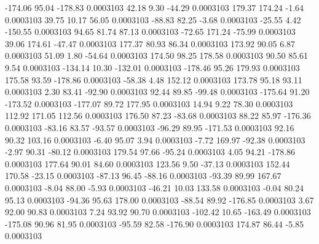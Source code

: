      -174.06       95.04     -178.83     0.0003103
       42.18        9.30      -44.29     0.0003103
      179.37      174.24       -1.64     0.0003103
       39.75       10.17       56.05     0.0003103
      -88.83       82.25       -3.68     0.0003103
      -25.55        4.42     -150.55     0.0003103
       94.65       81.74       87.13     0.0003103
      -72.65      171.24      -75.99     0.0003103
       39.06      174.61      -47.47     0.0003103
      177.37       80.93       86.34     0.0003103
      173.92       90.05        6.87     0.0003103
       51.09        1.80      -54.64     0.0003103
      174.50       98.25      178.58     0.0003103
       90.50       85.61        9.54     0.0003103
     -134.14       10.30     -132.01     0.0003103
     -178.46       95.26      179.93     0.0003103
      175.58       93.59     -178.86     0.0003103
      -58.38        4.48      152.12     0.0003103
      173.78       95.18       93.11     0.0003103
        2.30       83.41      -92.90     0.0003103
       92.44       89.85      -99.48     0.0003103
     -175.64       91.20     -173.52     0.0003103
     -177.07       89.72      177.95     0.0003103
       14.94        9.22       78.30     0.0003103
      112.92      171.05      112.56     0.0003103
      176.50       87.23      -83.68     0.0003103
       88.22       85.97     -176.36     0.0003103
      -83.16       83.57      -93.57     0.0003103
      -96.29       89.95     -171.53     0.0003103
       92.16       90.32      103.16     0.0003103
       -6.40       95.07        3.94     0.0003103
       -7.72      169.97      -92.38     0.0003103
       -2.97       90.31      -80.12     0.0003103
      179.54       97.66      -95.24     0.0003103
        4.05       94.21     -178.86     0.0003103
      177.64       90.01       84.60     0.0003103
      123.56        9.50      -37.13     0.0003103
      152.44      170.58      -23.15     0.0003103
      -87.13       96.45      -88.16     0.0003103
      -93.39       89.99      167.67     0.0003103
       -8.04       88.00       -5.93     0.0003103
      -46.21       10.03      133.58     0.0003103
       -0.04       80.24       95.13     0.0003103
      -94.36       95.63      178.00     0.0003103
      -88.54       89.92     -176.85     0.0003103
        3.67       92.00       90.83     0.0003103
        7.24       93.92       90.70     0.0003103
     -102.42       10.65     -163.49     0.0003103
     -175.08       90.96       81.95     0.0003103
      -95.59       82.58     -176.90     0.0003103
      174.87       86.44       -5.85     0.0003103
